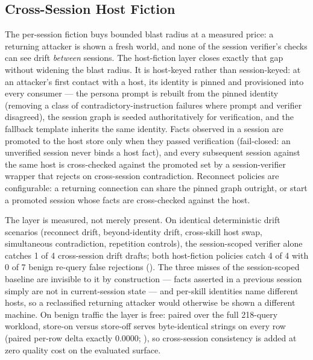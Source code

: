 \subsection{Cross-Session Host Fiction}
\label{sec:hostfiction}
The per-session fiction buys bounded blast radius
at a measured price: a returning attacker is shown a fresh world, and
none of the session verifier's checks can see drift \emph{between}
sessions. The host-fiction layer closes exactly that gap without
widening the blast radius. It is host-keyed rather than session-keyed:
at an attacker's first contact with a host, its identity is pinned and
provisioned into every consumer --- the persona prompt is rebuilt from
the pinned identity (removing a class of contradictory-instruction
failures where prompt and verifier disagreed), the session graph is
seeded authoritatively for verification, and the fallback template
inherits the same identity. Facts observed in a session are promoted to
the host store only when they passed verification (fail-closed: an
unverified session never binds a host fact), and every subsequent
session against the same host is cross-checked against the promoted
set by a session-verifier wrapper that rejects on cross-session
contradiction. Reconnect policies are configurable: a returning
connection can share the pinned graph outright, or start a promoted
session whose facts are cross-checked against the host.

The layer is measured, not merely present. On identical deterministic
drift scenarios (reconnect drift, beyond-identity drift, cross-skill
host swap, simultaneous contradiction, repetition controls), the
session-scoped verifier alone catches 1 of 4 cross-session drift drafts;
both host-fiction policies catch 4 of 4 with 0 of 7 benign re-query
false rejections (). The
three misses of the session-scoped baseline are invisible to it by
construction --- facts asserted in a previous session simply are not in
current-session state --- and per-skill identities name different hosts,
so a reclassified returning attacker would otherwise be shown a
different machine. On benign traffic the layer is free: paired over the
full 218-query workload, store-on versus store-off serves byte-identical
strings on every row (paired per-row delta exactly $0.0000$;
), so cross-session
consistency is added at zero quality cost on the evaluated surface.

